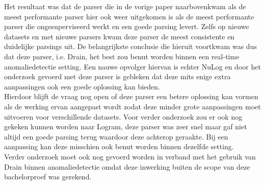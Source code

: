 Het resultaat was dat de parser die in de vorige paper naarbovenkwam als de meest performante parser hier ook weer uitgekomen is als de meest performante parser die ongesuperviseerd werkt en een goede parsing levert. Zelfs op nieuwe datasets en met nieuwe parsers kwam deze parser de meest consistente en duidelijke parsings uit.
De belangrijkste conclusie die hieruit voortkwam was dus dat deze parser, i.e. Drain, het best zou benut worden binnen een real-time anomaliedetectie setting. Een nauwe opvolger hiervan is echter NuLog en door het onderzoek gevoerd met deze parser is gebleken dat deze mits enige extra aanpassingen ook een goede oplossing kan bieden.\\

Hierdoor blijft de vraag nog open of deze parser een betere oplossing kan vormen als de werking ervan aangepast wordt zodat deze minder grote aanpassingen moet uitvoeren voor verschillende datasets. Voor verder onderzoek zou er ook nog gekeken kunnen worden naar Logram, deze parser was zeer snel maar gaf niet altijd een goede parsing terug waardoor deze achterop geraakte. Bij een aanpassing kan deze misschien ook benut worden binnen dezelfde setting.\\

Verder onderzoek moet ook nog gevoerd worden in verband met het gebruik van Drain binnen anomaliedetectie omdat deze inwerking buiten de scope van deze bachelorproef was gerekend.